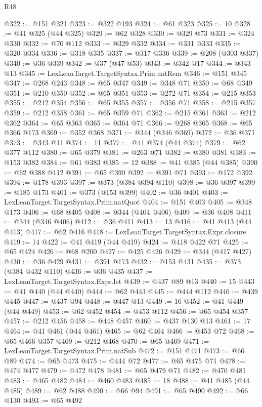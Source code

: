 \begin{lexlean}{R48}
\begin{coremodule}
@322 := @151 @321
@323 := @322 @193
@324 := @61 @323
@325 := 10
@328 := @41 @325 (@44 @325)
@329 := @62 @328
@330 := @329 @73
@331 := @324 @330
@332 := @70 @112
@333 := @329 @332
@334 := @331 @333
@335 := @320 @334
@336 := @318 @335
@337 := @317 @336
@339 := @208 (@303 @337)
@340 := @36 @339
@342 := @37 (@47 @53)
@343 := @342 @17
@344 := @343 @13
@345 := LexLeanTarget.TargetSyntax.Prim.natRem
@346 := @151 @345
@347 := @268 @243
@348 := @65 @347
@349 := @348 @71
@350 := @68 @349
@351 := @210 @350
@352 := @65 @351
@353 := @272 @71
@354 := @215 @353
@355 := @212 @354
@356 := @65 @355
@357 := @356 @71
@358 := @215 @357
@359 := @212 @358
@361 := @65 @359 @71
@362 := @215 @361
@363 := @212 @362
@364 := @65 @363
@365 := @364 @71
@366 := @268 @365
@368 := @65 @366 @173
@369 := @352 @368
@371 := @344 (@346 @369)
@372 := @36 @371
@373 := @343 @11
@374 := 11
@377 := @41 @374 (@44 @374)
@379 := @62 @377 @112
@380 := @65 @379
@381 := @263 @71
@382 := @380 @381
@383 := @153 @382
@384 := @61 @383
@385 := 12
@388 := @41 @385 (@44 @385)
@390 := @62 @388 @112
@391 := @65 @390
@392 := @391 @71
@393 := @172 @392
@394 := @178 @393
@397 := @373 (@384 @394 @110)
@398 := @36 @397
@399 := @185 @173
@401 := @373 (@153 @399)
@402 := @36 @401
@403 := LexLeanTarget.TargetSyntax.Prim.natQuot
@404 := @151 @403
@405 := @348 @173
@406 := @68 @405
@408 := @344 (@404 @406)
@409 := @36 @408
@411 := @344 (@346 @406)
@412 := @36 @411
@413 := 13
@416 := @41 @413 (@44 @413)
@417 := @62 @416
@418 := LexLeanTarget.TargetSyntax.Expr.closure
@419 := 14
@422 := @41 @419 (@44 @419)
@424 := @418 @422 @71
@425 := @65 @424
@426 := @68 @200
@427 := @425 @426
@429 := @344 (@417 @427)
@430 := @36 @429
@431 := @391 @173
@432 := @153 @431
@435 := @373 (@384 @432 @110)
@436 := @36 @435
@437 := LexLeanTarget.TargetSyntax.Expr.let
@439 := @437 @89 @13
@440 := 15
@443 := @41 @440 (@44 @440)
@444 := @62 @443
@445 := @444 @112
@446 := @439 @445
@447 := @437 @94
@448 := @447 @13
@449 := 16
@452 := @41 @449 (@44 @449)
@453 := @62 @452
@454 := @453 @112
@456 := @65 @454 @357
@457 := @212 @456
@458 := @448 @457
@460 := @437 @130 @13
@461 := 17
@464 := @41 @461 (@44 @461)
@465 := @62 @464
@466 := @453 @72
@468 := @65 @466 @357
@469 := @212 @468
@470 := @65 @469
@471 := LexLeanTarget.TargetSyntax.Prim.natSub
@472 := @151 @471
@473 := @66 @89
@474 := @65 @473
@475 := @444 @72
@477 := @65 @475 @71
@478 := @474 @477
@479 := @472 @478
@481 := @65 @479 @71
@482 := @470 @481
@483 := @465 @482
@484 := @460 @483
@485 := 18
@488 := @41 @485 (@44 @485)
@489 := @62 @488
@490 := @66 @94
@491 := @65 @490
@492 := @66 @130
@493 := @65 @492

\end{coremodule}
\end{lexlean}
